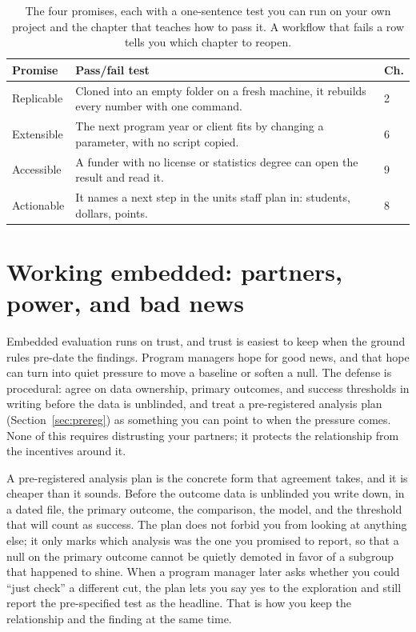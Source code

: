 \documentclass[
    a4paper,
    fontsize=10pt,
    twoside=true,
    numbers=noenddot,
]{kaobook}
\begin{document}
\begin{table}[htbp]
\centering
\footnotesize
\caption[The four promises, with pass/fail tests]{The four promises, each with a one-sentence test you can run on your own project and the chapter that teaches how to pass it. A workflow that fails a row tells you which chapter to reopen.}
\label{tab:promises}
\begin{tabular}{@{}p{1.9cm}p{4.5cm}p{1.0cm}@{}}
\hline
\textbf{Promise} & \textbf{Pass/fail test} & \textbf{Ch.} \\
\hline
Replicable & Cloned into an empty folder on a fresh machine, it rebuilds every number with one command. & 2 \\
Extensible & The next program year or client fits by changing a parameter, with no script copied. & 6 \\
Accessible & A funder with no license or statistics degree can open the result and read it. & 9 \\
Actionable & It names a next step in the units staff plan in: students, dollars, points. & 8 \\
\hline
\end{tabular}
\end{table}

\section{Working embedded: partners, power, and bad news}\label{sec:literacy}
Embedded evaluation runs on trust, and trust is easiest to keep when the ground rules pre-date the findings. Program managers hope for good news, and that hope can turn into quiet pressure to move a baseline or soften a null. The defense is procedural: agree on data ownership, primary outcomes, and success thresholds in writing before the data is unblinded, and treat a pre-registered analysis plan (Section~\ref{sec:prereg}) as something you can point to when the pressure comes. None of this requires distrusting your partners; it protects the relationship from the incentives around it.

A pre-registered analysis plan is the concrete form that agreement takes, and it is cheaper than it sounds. Before the outcome data is unblinded you write down, in a dated file, the primary outcome, the comparison, the model, and the threshold that will count as success. The plan does not forbid you from looking at anything else; it only marks which analysis was the one you promised to report, so that a null on the primary outcome cannot be quietly demoted in favor of a subgroup that happened to shine. When a program manager later asks whether you could \enquote{just check} a different cut, the plan lets you say yes to the exploration and still report the pre-specified test as the headline. That is how you keep the relationship and the finding at the same time.
\end{document}
